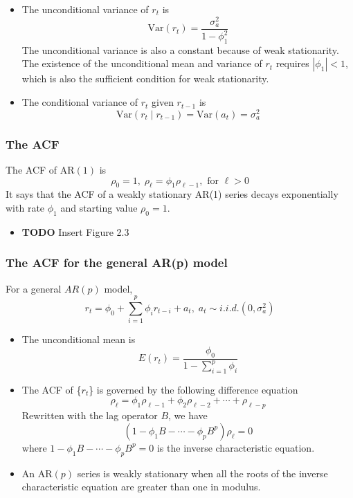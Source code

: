 \documentclass[a4paper,11pt]{article}
\newcommand{\var}{\mathrm{Var}}
\begin{document}
\begin{itemize}
\item The unconditional variance of \(r_t\) is 
\[ \var(r_t) = \frac{\sigma^2_a}{1 - \phi_1^2} \]
The unconditional variance is also a constant because of weak
stationarity. The existence of the unconditional mean and variance
of \(r_t\) requires \(|\phi_1| < 1\), which is also the sufficient
condition for weak stationarity.

\item The conditional variance of \(r_t\) given \(r_{t-1}\) is
\[ \var(r_t \mid r_{t-1}) = \var(a_t) = \sigma^2_a \]
\end{itemize}

\subsubsection*{The ACF}
\label{sec:org952224a}

The ACF of \(\mathrm{AR}(1)\) is
\[\rho_0 = 1,\; \rho_{\ell} = \phi_1 \rho_{\ell-1}, \text{ for }
\ell>0 \]
It says that the ACF of a weakly stationary AR(1) series decays
exponentially with rate \(\phi_1\) and starting value \(\rho_0=1\). 

\begin{itemize}
\item {\bfseries\sffamily TODO} Insert Figure 2.3
\label{sec:org8f1e13d}
\end{itemize}

\subsubsection*{The ACF for the general AR(p) model}
\label{sec:orgd956dff}

For a general \(AR(p)\) model, 
\begin{equation}
\label{eq-arp}
r_t = \phi_0 + \sum_{i=1}^p \phi_i r_{t-i} + a_t,\; a_t \sim i.i.d.(0, \sigma^2_a)
\end{equation}

\begin{itemize}
\item The unconditional mean is 
\[ E(r_t) = \frac{\phi_0}{1 - \sum_{i=1}^p \phi_i} \]

\item The ACF of \{\(r_t\)\} is governed by the following difference equation
\[ \rho_{\ell} = \phi_1 \rho_{\ell-1} + \phi_2 \rho_{\ell-2} +
  \cdots + \rho_{\ell-p} \]
Rewritten with the lag operator \(B\), we have
\[ (1 - \phi_1 B - \cdots - \phi_p B^p) \rho_{\ell} = 0 \]
where \(1 - \phi_1 B - \cdots - \phi_p B^p=0\) is the inverse
characteristic equation.

\item An \(\mathrm{AR}(p)\) series is weakly stationary when all the roots
of the inverse characteristic equation are greater than one in
modulus.
\end{itemize}
\end{document}
